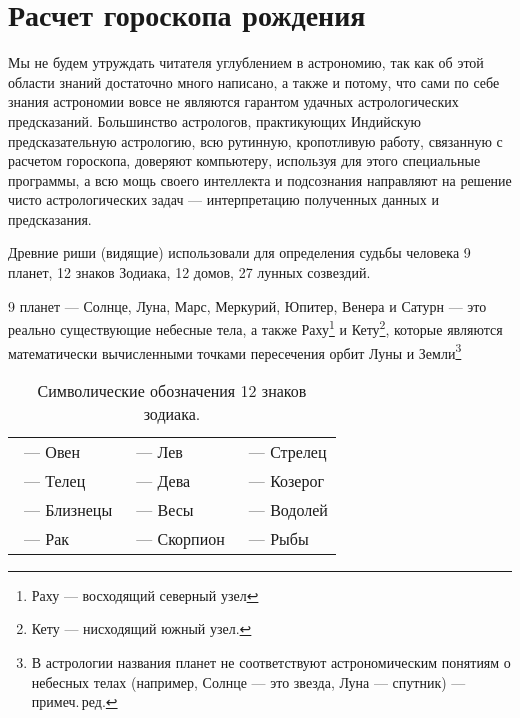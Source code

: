 \section{Расчет гороскопа рождения}

Мы не будем утруждать читателя углублением в астрономию, так как об этой области знаний достаточно много написано, а также и потому, что сами по себе знания астрономии вовсе не являются гарантом удачных астрологических предсказаний. Большинство астрологов, практикующих Индийскую предсказательную астрологию, всю рутинную, кропотливую работу, связанную с расчетом гороскопа, доверяют компьютеру, используя для этого специальные программы, а всю мощь своего интеллекта и подсознания направляют на решение чисто астрологических задач --- интерпретацию полученных данных и предсказания.

Древние риши (видящие) использовали для определения судьбы человека 9 планет, 12 знаков Зодиака, 12 домов, 27 лунных созвездий.

9 планет --- Солнце, Луна, Марс, Меркурий, Юпитер, Венера и Сатурн --- это реально существующие небесные тела, а также Раху\footnote{Раху --- восходящий северный узел} и Кету\footnote{Кету --- нисходящий южный узел.}, которые являются математически вычисленными точками пересечения орбит Луны и Земли\footnote{В астрологии названия планет не соответствуют астрономическим понятиям о небесных телах (например, Солнце --- это звезда, Луна --- спутник) --- примеч.\,ред.}

\begin{table}[tph!]
	\caption{Символические обозначения 12 знаков зодиака.}
	\label{tbl:signs}

	\centering

	\renewcommand{\arraystretch}{2}

	\setlength{\tabcolsep}{.05\textwidth}

	\begin{tabular}{lll}
		\aries\ --- Овен      & \leo\ --- Лев    & \sagittarius\ --- Стрелец \\
		\taurus\ --- Телец    & \virgo\ --- Дева & \capricornus\ --- Козерог \\
		\gemini\ --- Близнецы & \libra\ --- Весы & \aquarius\ --- Водолей \\
		\cancer\ --- Рак      & \scorpio\ --- Скорпион & \pisces\ --- Рыбы \\
	\end{tabular}
\end{table}

